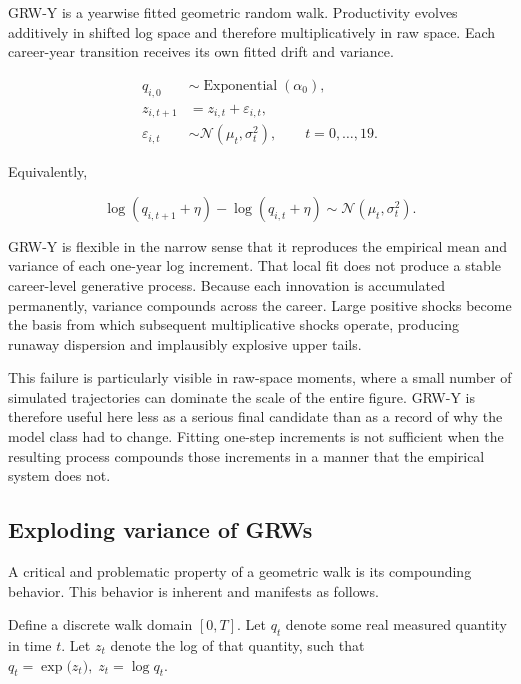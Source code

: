 \documentclass[twocolumn, letterpaper]{article}
\begin{document}
GRW-Y is a yearwise fitted geometric random walk. Productivity evolves additively in shifted log space and therefore multiplicatively in raw space. Each career-year transition receives its own fitted drift and variance.

\begin{equation}
    \begin{aligned}
    q_{i,0}
        &\sim \operatorname{Exponential}(\alpha_0),\\[4pt]
    z_{i,t+1}
        &=z_{i,t}+\varepsilon_{i,t},\\[4pt]
    \varepsilon_{i,t}
        &\sim\mathcal{N}\left(\mu_t,\sigma_t^2\right),
        \qquad t=0,\ldots,19.
    \end{aligned}
\label{eq:grw_y}
\end{equation}

Equivalently,

\[
    \log(q_{i,t+1}+\eta)
    -
    \log(q_{i,t}+\eta)
    \sim
    \mathcal{N}(\mu_t,\sigma_t^2).
\]

GRW-Y is flexible in the narrow sense that it reproduces the empirical mean and variance of each one-year log increment. That local fit does not produce a stable career-level generative process. Because each innovation is accumulated permanently, variance compounds across the career. Large positive shocks become the basis from which subsequent multiplicative shocks operate, producing runaway dispersion and implausibly explosive upper tails.

This failure is particularly visible in raw-space moments, where a small number of simulated trajectories can dominate the scale of the entire figure. GRW-Y is therefore useful here less as a serious final candidate than as a record of why the model class had to change. Fitting one-step increments is not sufficient when the resulting process compounds those increments in a manner that the empirical system does not.

\subsection{Exploding variance of GRWs}
\label{supp:grw_explode}
A critical and problematic property of a geometric walk is its compounding behavior. This behavior is inherent and manifests as follows. 

Define a discrete walk domain $[0,T]$. Let $q_t$ denote some real measured quantity in time $t$. Let $z_t$ denote the log of that quantity, such that $q_t = \exp\big( z_t\big), \; z_t = \log q_t$. 
\end{document}
